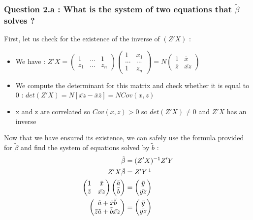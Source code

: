 \documentclass{article}
\begin{document}
\subsubsection{Question 2.a : What is the system of two equations that $\tilde{\beta}$ solves ?}
First, let us check for the existence of the inverse of $(Z'X)$ : 
\begin{itemize}
    \item We have : $Z'X=\begin{pmatrix} 1 & ...& 1\\ z_1 & ...& z_n\end{pmatrix}\begin{pmatrix} 1 & x_1\\ ... & ...\\ 1 & z_n\end{pmatrix} =N \begin{pmatrix} 1 & \bar{x}\\ \bar{z} & \bar{xz}\end{pmatrix}$
    \item We compute the determinant for this matrix and check whether it is equal to 0 : $det(Z'X) = N[\bar{xz}-\bar{x}\bar{z}] = NCov(x,z)$
    \item x and z are correlated so $Cov(x,z)>0$ so $det(Z'X) \neq 0$ and $Z'X$ has an inverse
\end{itemize}
Now that we have ensured its existence, we can safely use the formula provided for $\tilde{\beta}$ and find the system of equations solved by $\tilde{b}$ : 
\begin{equation}
\begin{aligned}
    \tilde{\beta} &= (Z'X)^{-1}Z'Y \\
    Z'X\tilde{\beta} &= Z'Y\,\footnotemark[1]\\
     \begin{pmatrix} 1 & \bar{x} \\ \bar{z} & \bar{xz}\end{pmatrix} \begin{pmatrix} \tilde{a} \\ \tilde{b}\end{pmatrix} &= \begin{pmatrix} \bar{y} \\ \bar{yz} \end{pmatrix} \\
    \begin{pmatrix} \tilde{a} + \bar{x}\tilde{b} \\ \bar{z}\tilde{a}+\tilde{b}\bar{xz} \end{pmatrix} &= \begin{pmatrix} \bar{y} \\ \bar{yz} \end{pmatrix}  \\
\end{aligned}
\end{equation}
\end{document}
